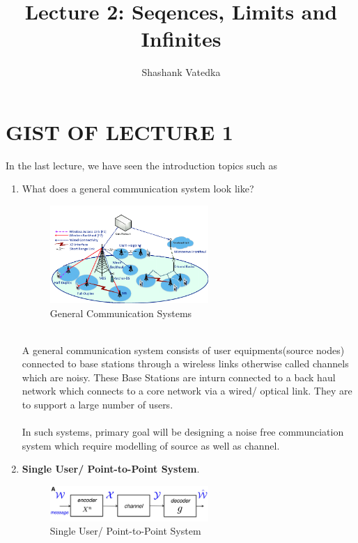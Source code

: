 \documentclass[a4paper]{article}
\title{Lecture 2: Seqences, Limits and Infinites}
\author{Shashank Vatedka}
\begin{document}

\section{GIST OF LECTURE 1}
In the last lecture, we have seen the introduction topics such as\\
\begin{enumerate}
\item	What does a general communication system look like?
\begin{figure}[!ht]
\centering
\includegraphics[width=6.0cm]{wireless image 1.png}
\caption{General Communication Systems}\label{fig:1}
\end{figure} \\
A general communication system consists of user equipments(source nodes) connected to base stations through a wireless links otherwise called channels which are noisy. These Base Stations are inturn connected to a back haul network which connects to a core network via a wired/ optical link. They are to support a large number of users.\\
\\
In such systems, primary goal will be designing a noise free communciation system which require modelling of source as well as channel. 
\\
\item \textbf{Single User/ Point-to-Point System}.\\
\begin{figure}[!ht]
\centering
\includegraphics[width=6.0cm]{simple_encoder_decoder.png}
\caption{Single User/ Point-to-Point System}\label{fig:2}
\end{figure} \\

\end{enumerate}
\end{document}
